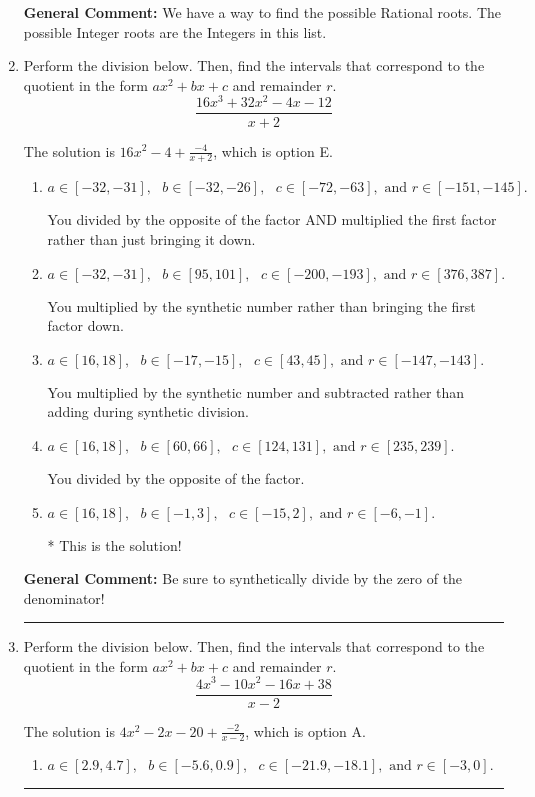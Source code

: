 \documentclass{extbook}[14pt]
\newcommand{\litem}[1]{\item #1

\rule{\textwidth}{0.4pt}}
\begin{document}
\begin{enumerate}
{\textbf{General Comment:} We have a way to find the possible Rational roots. The possible Integer roots are the Integers in this list.
}
\litem{
Perform the division below. Then, find the intervals that correspond to the quotient in the form $ax^2+bx+c$ and remainder $r$.
\[ \frac{16x^{3} +32 x^{2} -4 x -12}{x + 2} \]

The solution is \( 16x^{2} -4 + \frac{-4}{x + 2} \), which is option E.\begin{enumerate}[label=\Alph*.]
\item \( a \in [-32, -31], \text{   } b \in [-32, -26], \text{   } c \in [-72, -63], \text{   and   } r \in [-151, -145]. \)

 You divided by the opposite of the factor AND multiplied the first factor rather than just bringing it down.
\item \( a \in [-32, -31], \text{   } b \in [95, 101], \text{   } c \in [-200, -193], \text{   and   } r \in [376, 387]. \)

 You multiplied by the synthetic number rather than bringing the first factor down.
\item \( a \in [16, 18], \text{   } b \in [-17, -15], \text{   } c \in [43, 45], \text{   and   } r \in [-147, -143]. \)

 You multiplied by the synthetic number and subtracted rather than adding during synthetic division.
\item \( a \in [16, 18], \text{   } b \in [60, 66], \text{   } c \in [124, 131], \text{   and   } r \in [235, 239]. \)

 You divided by the opposite of the factor.
\item \( a \in [16, 18], \text{   } b \in [-1, 3], \text{   } c \in [-15, 2], \text{   and   } r \in [-6, -1]. \)

* This is the solution!
\end{enumerate}

\textbf{General Comment:} Be sure to synthetically divide by the zero of the denominator!
}
\litem{
Perform the division below. Then, find the intervals that correspond to the quotient in the form $ax^2+bx+c$ and remainder $r$.
\[ \frac{4x^{3} -10 x^{2} -16 x + 38}{x -2} \]

The solution is \( 4x^{2} -2 x -20 + \frac{-2}{x -2} \), which is option A.\begin{enumerate}[label=\Alph*.]
\item \( a \in [2.9, 4.7], \text{   } b \in [-5.6, 0.9], \text{   } c \in [-21.9, -18.1], \text{   and   } r \in [-3, 0]. \)


\end{enumerate}}
\end{enumerate}
\end{document}
